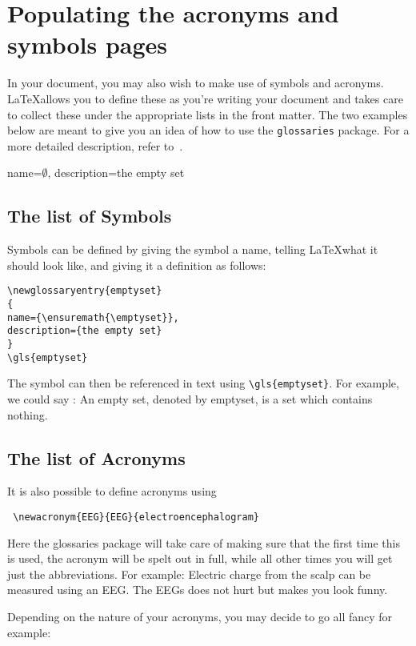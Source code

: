 \section{Populating the acronyms and symbols pages}
In your document, you may also wish to make use of symbols and acronyms. \LaTeX allows you to define these as you're writing your document and takes care to collect these under the appropriate lists in the front matter. The two examples below are meant to give you an idea of how to use the \texttt{glossaries} package. For a more detailed description, refer to~\cite{Talbot2015}.


{
name={\ensuremath{\emptyset}},
description={the empty set}
}

\subsection{The list of Symbols}
Symbols can be defined by giving the symbol a name, telling \LaTeX what it should look like, and giving it a definition as follows:

\begin{verbatim}
\newglossaryentry{emptyset}
{
name={\ensuremath{\emptyset}},
description={the empty set}
}
\gls{emptyset}
\end{verbatim}

 The symbol can then be referenced in text using \verb|\gls{emptyset}|. For example, we could say : An empty set, denoted by \gls{emptyset}, is a set which contains nothing.


\subsection{The list of Acronyms}

 It is also possible to define acronyms using \\
 \begin{verbatim}
 \newacronym{EEG}{EEG}{electroencephalogram}
 \end{verbatim}

 Here the glossaries package will take care of making sure that the first time this is used, the acronym will be spelt out in full, while all other times you will get just the abbreviations. For example:  Electric charge from the scalp can be measured using an \gls{EEG}. The \glspl{EEG} does not hurt but makes you look funny.

 Depending on the nature of your acronyms, you may decide to go all fancy for example:

